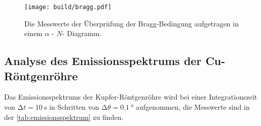 \begin{figure}
  \centering
  \texttt{[image: build/bragg.pdf]}
  \caption{Die Messwerte der Überprüfung der Bragg-Bedingung aufgetragen in einem $\alpha$ - $N$- Diagramm.}
  \label{fig:bragg}
\end{figure}



\subsection{Analyse des Emissionsspektrums der Cu-Röntgenröhre}

Das Emissionsspektrums der Kupfer-Röntgenröhre wird bei einer Integrationszeit von $\increment t = \SI{10}{\second}$ in Schritten von $\increment \theta = \SI{0.1}{\degree}$
aufgenommen, die Messwerte sind in der \autoref{tab:emissionsspektrum} zu finden. 

